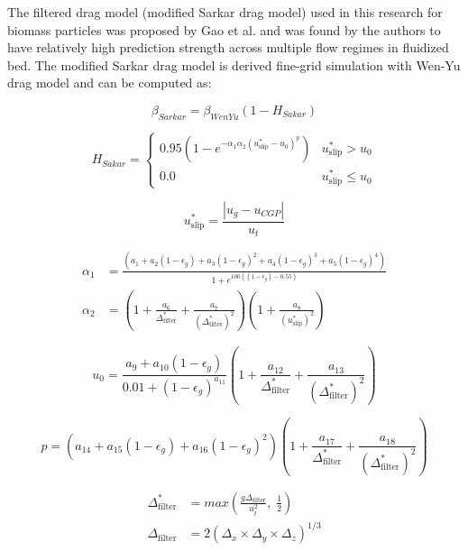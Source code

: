 The filtered drag model (modified Sarkar drag model) used in this research for biomass particles was proposed by Gao et al. \cite{Gao-2018} and was found by the authors to have relatively high prediction strength across multiple flow regimes in fluidized bed. The modified Sarkar drag model is derived fine-grid simulation with Wen-Yu drag model and can be computed as:

\begin{equation}
    \beta_{Sarkar} = \beta_{WenYu} (1 - H_{Sakar})
\end{equation}

\begin{equation}
    H_{Sakar} =
    \begin{cases}
        0.95 \left(1 - e^{-\alpha_1 \alpha_2 (u_{\text{slip}}^* - u_0)^p} \right) & u_{\text{slip}}^* > u_0 \\
        0.0 & u_{\text{slip}}^* \leq u_0
    \end{cases}
\end{equation}

\begin{equation}
    u_{\text{slip}}^* = \frac{|u_g - u_{CGP}|}{u_t}
\end{equation}

\begin{align}
    \alpha_1 &= \frac{\left(a_1 + a_2(1 - \epsilon_g) + a_3(1 - \epsilon_g)^2 + a_4(1 - \epsilon_g)^3 + a_5(1 - \epsilon_g)^4 \right)}{1 + e^{100 \left((1 - \epsilon_g) - 0.55 \right)}} \\
    \alpha_2 &= \left(1 + \frac{a_6}{\Delta_{\text{filter}}^*} + \frac{a_7}{(\Delta_{\text{filter}}^*)^2} \right) \left(1 + \frac{a_8}{(u_{\text{slip}}^*)^2} \right)
\end{align}

\begin{equation}
    u_0 = \frac{a_9 + a_{10} (1 - \epsilon_g)}{0.01 + (1 - \epsilon_g)^{a_{11}}} \left(1 + \frac{a_{12}}{\Delta_{\text{filter}}^*} + \frac{a_{13}}{(\Delta_{\text{filter}}^*)^2} \right)
\end{equation}

\begin{equation}
    p = \left(a_{14} + a_{15}(1 - \epsilon_g) + a_{16}(1 - \epsilon_g)^2 \right) \left(1 + \frac{a_{17}}{\Delta_{\text{filter}}^*} + \frac{a_{18}}{(\Delta_{\text{filter}}^*)^2} \right)
\end{equation}

\begin{align}
    \Delta_{\text{filter}}^* &= max\left( \frac{g \Delta_{\text{filter}}}{u_t^2}, \; \frac{1}{2} \right) \\
    \Delta_{\text{filter}} &= 2 (\Delta_x \times \Delta_y \times \Delta_z)^{1/3}
\end{align}

